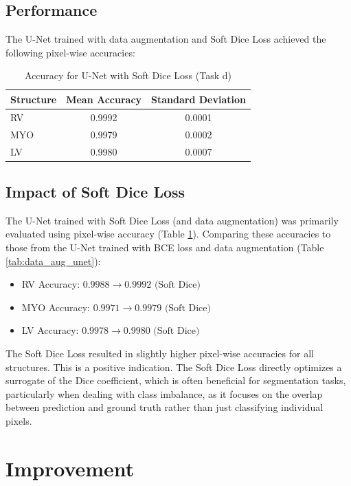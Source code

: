 \documentclass{article}
\begin{document}
\subsection{Performance}
The U-Net trained with data augmentation and Soft Dice Loss achieved the following pixel-wise accuracies:
\begin{table}[H]
\centering
\caption{Accuracy for U-Net with Soft Dice Loss (Task d)}
\label{tab:soft_dice_unet}
\begin{tabular}{lcc}
\toprule
Structure & Mean Accuracy & Standard Deviation \\
\midrule
RV        & 0.9992      & 0.0001             \\
MYO       & 0.9979      & 0.0002             \\
LV        & 0.9980      & 0.0007             \\
\bottomrule
\end{tabular}
\end{table}

\subsection{Impact of Soft Dice Loss}
The U-Net trained with Soft Dice Loss (and data augmentation) was primarily evaluated using pixel-wise accuracy 
(Table \ref{tab:soft_dice_unet}). Comparing these accuracies to those from the U-Net trained with BCE loss and 
data augmentation (Table \ref{tab:data_aug_unet}):
\begin{itemize}
  \item RV Accuracy: $0.9988 \rightarrow 0.9992 \text{ (Soft Dice)}$
  \item MYO Accuracy: $0.9971 \rightarrow 0.9979 \text{ (Soft Dice)}$
  \item LV Accuracy: $0.9978 \rightarrow 0.9980 \text{ (Soft Dice)}$
\end{itemize}
The Soft Dice Loss resulted in slightly higher pixel-wise accuracies for all structures. This is a positive indication. 
The Soft Dice Loss directly optimizes a surrogate of the Dice coefficient, which is often beneficial for segmentation tasks, 
particularly when dealing with class imbalance, as it focuses on the overlap between prediction and ground truth rather 
than just classifying individual pixels.



\section{Improvement}
\end{document}
